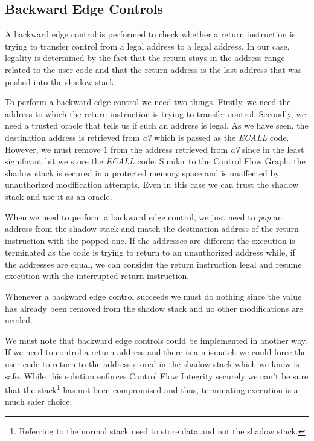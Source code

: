 \subsection{Backward Edge Controls}
\label{subsec:backward}

A backward edge control is performed to check whether a return instruction is
trying to transfer control from a legal address to a legal address. In our case,
legality is determined by the fact that the return stays in the address range
related to the user code and that the return address is the last address that
was pushed into the shadow stack.

To perform a backward edge control we need two things. Firstly, we need the
address to which the return instruction is trying to transfer control. Secondly,
we need a trusted oracle that tells us if such an address is legal. As we have seen,
the destination address is retrieved from \textit{a7} which is passed as the \textit{ECALL}
code. However, we must remove $1$ from the address retrieved from \textit{a7} since
in the least significant bit we store the \textit{ECALL} code. Similar to the Control
Flow Graph, the shadow stack is secured in a protected memory space and is
unaffected by unauthorized modification attempts. Even in this case we can trust
the shadow stack and use it as an oracle.

When we need to perform a backward edge control, we just need to \textit{pop} an
address from the shadow stack and match the destination address of the return instruction
with the popped one. If the addresses are different the execution is terminated
as the code is trying to return to an unauthorized address while, if the addresses
are equal, we can consider the return instruction legal and resume execution
with the interrupted return instruction.

Whenever a backward edge control succeeds we must do nothing since the value has
already been removed from the shadow stack and no other modifications are needed.

We must note that backward edge controls could be implemented in another way. If
we need to control a return address and there is a mismatch we could force the user
code to return to the address stored in the shadow stack which we know is safe.
While this solution enforces Control Flow Integrity securely we can't be sure
that the stack\footnote{Referring to the normal stack used to store data and not
the shadow stack.} has not been compromised and thus, terminating execution is a
much safer choice.

